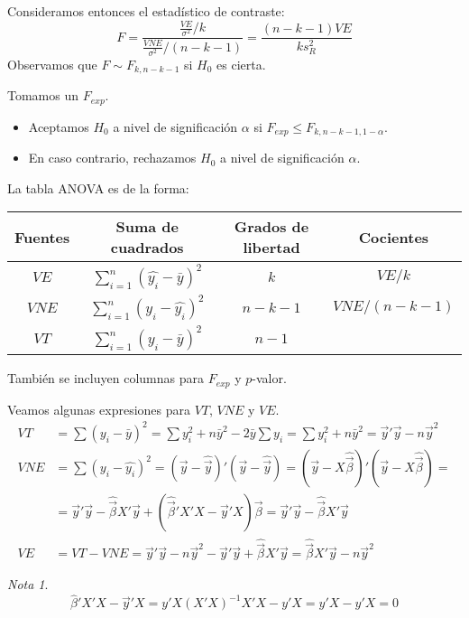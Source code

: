 \documentclass{report}
\theoremstyle{remark}
\theoremstyle{remark}
\newtheorem*{note}{Nota}
\theoremstyle{remark}
\theoremstyle{definition}
\theoremstyle{definition}
\theoremstyle{definition}
\begin{document}
Consideramos entonces el estadístico de contraste:
$$F = \frac{\frac{VE}{\sigma^2} / k}{\frac{VNE}{\sigma^2} / (n-k-1)} = \frac{(n-k-1)VE}{ks_R^2}$$
Observamos que $F \sim F_{k, n-k-1}$ si $H_0$ es cierta.

Tomamos un $F_{exp}$.
\begin{itemize}
    \item Aceptamos $H_0$ a nivel de significación $\alpha$ si $F_{exp} \leq F_{k, n-k-1, 1-\alpha}$.
    \item En caso contrario, rechazamos $H_0$ a nivel de significación $\alpha$.
\end{itemize}

La tabla ANOVA es de la forma:
\begin{center}
    \begin{tabular}{| c | c | c | c |}
        \hline
        Fuentes & Suma de cuadrados                   & Grados de libertad & Cocientes     \\
        \hline
        $VE$    & $\sum_{i=1}^n(\hat{y_i}-\bar{y})^2$ & $k$                & $VE/k$        \\
        $VNE$   & $\sum_{i=1}^n(y_i - \hat{y_i})^2$   & $n-k-1$            & $VNE/(n-k-1)$ \\
        $VT$    & $\sum_{i=1}^n(y_i - \bar{y})^2$     & $n-1$              &               \\
        \hline
    \end{tabular}
\end{center}
También se incluyen columnas para $F_{exp}$ y $p$-valor.

Veamos algunas expresiones para $VT$, $VNE$ y $VE$.
\begin{align*}
    VT  & = \sum (y_i - \bar{y})^2 = \sum y_i^2 + n\bar{y}^2 - 2\bar{y}\sum y_i = \sum y_i^2 + n\bar{y}^2 = \vec{y}'\vec{y} - n\vec{y}^2                     \\
    VNE & = \sum (y_i - \hat{y_i})^2 = (\vec{y} - \hat{\vec{y}})'(\vec{y} - \hat{\vec{y}}) = (\vec{y} - X\hat{\vec{\beta}})'(\vec{y} - X\hat{\vec{\beta}}) = \\
        & = \vec{y}'\vec{y} - \hat{\vec{\beta}}X'\vec{y} + (\hat{\vec{\beta}}'X'X - \vec{y}'X)\vec{\beta} = \vec{y}'\vec{y} - \hat{\vec{\beta}}X'\vec{y}     \\
    VE  & = VT - VNE = \vec{y}'\vec{y} - n\vec{y}^2 - \vec{y}'\vec{y} + \hat{\vec{\beta}}X'\vec{y} = \hat{\vec{\beta}}X'\vec{y} - n\vec{y}^2
\end{align*}

\begin{note}
    $$\hat{\beta}'X'X - \vec{y}'X = y'X(X'X)^{-1}X'X - y'X = y'X - y'X = 0$$
\end{note}
\end{document}
